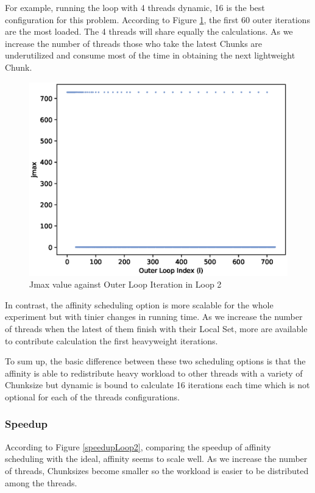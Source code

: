 \documentclass[12pt,a4paper]{article}
\begin{document}
For example, running the loop with 4 threads dynamic, 16 is the best configuration for this problem. According to Figure \ref{jmax}, the first 60 outer iterations are the most loaded. The 4 threads will share equally the calculations. As we increase the number of threads those who take the latest Chunks are underutilized and consume most of the time in obtaining the next lightweight Chunk.

\begin{figure}[h!]
    \centering
    \includegraphics[scale=0.6]{../graphs/jmax.eps}
    \caption{Jmax value against Outer Loop Iteration in Loop 2}
    \label{jmax}
\end{figure}

In contrast, the affinity scheduling option is more scalable for the whole experiment but with tinier changes in running time. As we increase the number of threads when the latest of them finish with their Local Set, more are available to contribute calculation the first heavyweight iterations.

To sum up, the basic difference between these two scheduling options is that the affinity is able to redistribute heavy workload to other threads with a variety of Chunksize but dynamic is bound to calculate 16 iterations each time which is not optional for each of the threads configurations.

\subsubsection{Speedup}

According to Figure \ref{speedupLoop2}, comparing the speedup of affinity scheduling with the ideal, affinity seems to scale well. As we increase the number of threads, Chunksizes become smaller so the workload is easier to be distributed among the threads.
\end{document}
